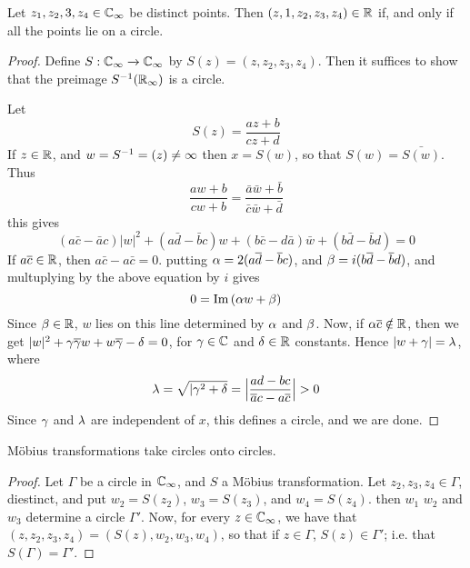 \begin{lemma}\label{3.3.7}
    Let $z_1,z_2,3,z_4 \in \mathbb{C}_\infty$ be distinct points. Then
    $(z,1,z_2,z_3,z_4) \in \mathbb{R}$ if, and only if all the points lie on a circle.
\end{lemma}
\begin{proof}
    Define $S:\mathbb{C}_\infty \xrightarrow{} \mathbb{C}_\infty$ by $S(z)=(z,z_2,z_3,z_4)$.
    Then it suffices to show that the preimage $S^{-1}(\mathbb{R}_\infty)$ is a circle.

    Let
    \begin{equation*}
        S(z)=\frac{az+b}{cz+d}
    \end{equation*}
    If $z \in \mathbb{R}$, and  $w=S^{-1}=(z) \neq \infty$ then $x=S(w)$, so that
    $S(w)=\bar{S(w)}$. Thus
    \begin{equation*}
        \frac{aw+b}{cw+b}=\frac{\bar{a}\bar{w}+\bar{b}}{\bar{c}\bar{w}+\bar{d}}
    \end{equation*}
    this gives
    \begin{equation*}
        (a\bar{c}-\bar{a}c)|w|^2+(a\bar{d}-\bar{b}c)w+(b\bar{c}-d\bar{a})\bar{w}+
        (b\bar{d}-\bar{b}d)=0
    \end{equation*}
    If $a\overline{c} \in \mathbb{R}$, then $a\bar{c}-a\bar{c}=0$. putting
    $\alpha=2(a\overline{d}-\overline{b}c)$, and $\beta=i(b\overline{d}-\overline{b}d)$, and multuplying by
    the above equation by $i$ gives
    \begin{equation*}
        0=\operatorname{Im}{(\alpha w+\beta)}
    \end{equation*}
    Since $\beta \in \mathbb{R}$,  $w$ lies on this line determined by  $\alpha$ and  $\beta$.
    Now, if  $\alpha\overline{c} \notin \mathbb{R}$, then we get
    $|w|^2+\gamma\overline{\gamma}w+w\overline{\gamma}-\delta=0$, for $\gamma \in \mathbb{C}$ and  $\delta \in \mathbb{R}$
    constants. Hence  $|w+\gamma|=\lambda$, where
     \begin{equation*}
         \lambda=\sqrt{|\gamma^2+\delta}=\Big{|} \frac{ad-bc}{\overline{a}c-a\overline{c}} \Big{|}>0
     \end{equation*}
     Since $\gamma$ and  $\lambda$ are independent of  $x$, this defines a circle, and we
     are done.
\end{proof}

\begin{theorem}\label{3.3.8}
    M\"obius transformations take circles onto circles.
\end{theorem}
\begin{proof}
    Let $\Gamma$ be a circle in  $\mathbb{C}_\infty$, and  $S$ a M\"obius
    transformation. Let  $z_2,z_3,z_4 \in \Gamma$, diestinct, and put
    $w_2=S(z_2)$, $w_3=S(z_3)$, and $w_4=S(z_4)$. then $w_1$ $w_2$ and $w_3$
    determine a circle $\Gamma'$. Now, for every  $z \in \mathbb{C}_\infty$, we have
    that  $(z,z_2,z_3,z_4)=(S(z),w_2,w_3,w_4)$, so that if $z \in \Gamma$,
    $S(z) \in \Gamma'$; i.e. that $S(\Gamma)=\Gamma'$.
\end{proof}

